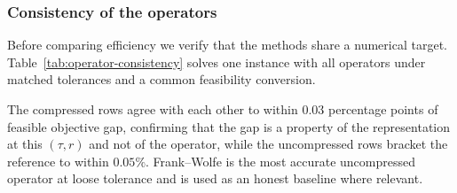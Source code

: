 \documentclass[11pt]{article}
\begin{document}
\subsubsection*{Consistency of the operators}


Before comparing efficiency we verify that the methods share a numerical target.
Table~\ref{tab:operator-consistency} solves one instance with all operators under matched
tolerances and a common feasibility conversion.


\begin{table}[h]
\centering

\caption{Numerical consistency on Sioux Falls under matched stopping tolerances. The
reference is the best feasible point over the uncompressed operators (full-path gradient
projection, feasible objective $4.231\times10^{6}$, certificate $9.1\times10^{-10}$). The
augmented Lagrangian's feasibility-based stopping rule leaves it $0.048\%$ above that
reference; the near-agreement of all operators is the consistency this table quantifies.}
\label{tab:operator-consistency}

\end{table}


The compressed rows agree with each other to within $0.03$ percentage points of feasible
objective gap, confirming that the gap is a property of the representation at this
$(\tau,r)$ and not of the operator, while the uncompressed rows bracket the reference to
within $0.05\%$. Frank--Wolfe is the most accurate uncompressed operator at loose tolerance
and is used as an honest baseline where relevant.
\end{document}
